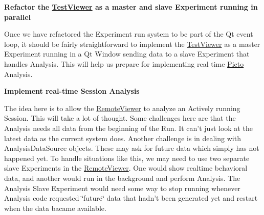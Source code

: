 {\bfseries Refactor the \hyperlink{class_test_viewer}{Test\-Viewer} as a master and slave Experiment running in parallel}\par
 Once we have refactored the Experiment run system to be part of the Qt event loop, it should be fairly straightforward to implement the \hyperlink{class_test_viewer}{Test\-Viewer} as a master Experiment running in a Qt Window sending data to a slave Experiment that handles Analysis. This will help us prepare for implementing real time \hyperlink{namespace_picto}{Picto} Analysis.

{\bfseries Implement real-\/time Session Analysis}\par
 The idea here is to allow the \hyperlink{class_remote_viewer}{Remote\-Viewer} to analyze an Actively running Session. This will take a lot of thought. Some challenges here are that the Analysis needs all data from the beginning of the Run. It can't just look at the latest data as the current system does. Another challenge is in dealing with Analysis\-Data\-Source objects. These may ask for future data which simply has not happened yet. To handle situations like this, we may need to use two separate slave Experiments in the \hyperlink{class_remote_viewer}{Remote\-Viewer}. One would show realtime behavioral data, and another would run in the background and perform Analysis. The Analysis Slave Experiment would need some way to stop running whenever Analysis code requested \char`\"{}future\char`\"{} data that hadn't been generated yet and restart when the data bacame available. 